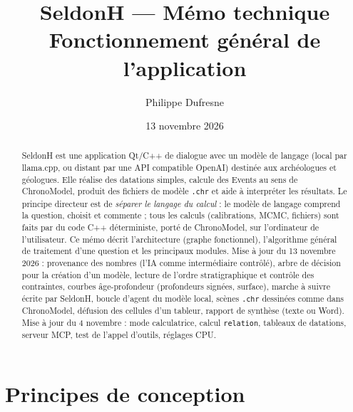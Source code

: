 \documentclass[11pt,a4paper]{article}
\title{\textbf{SeldonH} --- Mémo technique\\[2pt]\large Fonctionnement général de l'application}
\author{Philippe Dufresne}
\date{13 novembre 2026}
\newcommand{\code}[1]{\texttt{\small #1}}
\begin{document}
\maketitle

\begin{abstract}
SeldonH est une application Qt/C++ de dialogue avec un modèle de langage (local par llama.cpp, ou distant par une API
compatible OpenAI) destinée aux archéologues et géologues. Elle réalise des datations simples, calcule des Events au sens
de ChronoModel, produit des fichiers de modèle \code{.chr} et aide à interpréter les résultats. Le principe directeur est
de \emph{séparer le langage du calcul} : le modèle de langage comprend la question, choisit et commente ; tous les
calculs (calibrations, MCMC, fichiers) sont faits par du code C++ déterministe, porté de ChronoModel, sur l'ordinateur de
l'utilisateur. Ce mémo décrit l'architecture (graphe fonctionnel), l'algorithme général de traitement d'une question et
les principaux modules. Mise à jour du 13 novembre 2026 : provenance des nombres (l'IA comme intermédiaire contrôlé),
arbre de décision pour la création d'un modèle, lecture de l'ordre stratigraphique et contrôle des contraintes, courbes
âge-profondeur (profondeurs signées, surface), marche à suivre écrite par SeldonH, boucle d'agent du modèle local,
scènes \code{.chr} dessinées comme dans ChronoModel, défusion des cellules d'un tableur, rapport de synthèse
(texte ou Word). Mise à jour du 4 novembre : mode
calculatrice, calcul \code{relation}, tableaux de datations, serveur MCP, test de l'appel d'outils, réglages CPU.
\end{abstract}

\tableofcontents

\section{Principes de conception}
\end{document}
